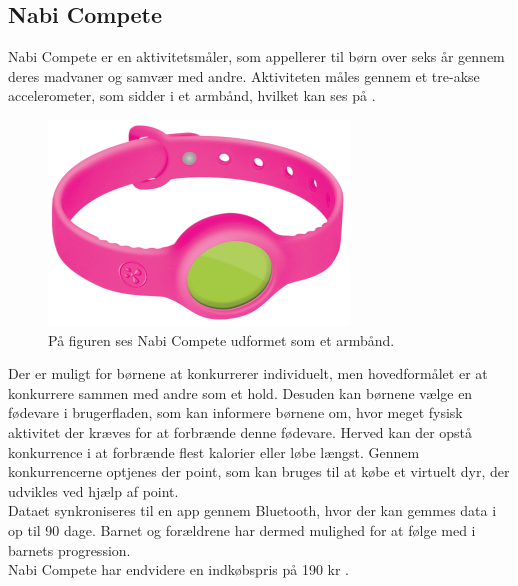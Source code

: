 \subsection{Nabi Compete}
Nabi Compete er en aktivitetsmåler, som appellerer til børn over seks år gennem deres madvaner og samvær med andre. Aktiviteten måles gennem et tre-akse accelerometer, som sidder i et armbånd, hvilket kan ses på .
\begin{figure}[H]
	\centering
	\includegraphics[scale=0.55]{figures/aProblemanalyse/nabi.png}
	\caption{På figuren ses Nabi Compete udformet som et armbånd. \citep{Perez2015}}
	\label{fig:nabi}
\end{figure}\vspace{-.25cm}
Der er muligt for børnene at konkurrerer individuelt, men hovedformålet er at konkurrere sammen med andre som et hold. Desuden kan børnene vælge en fødevare i brugerfladen, som kan informere børnene om, hvor meget fysisk aktivitet der kræves for at forbrænde denne fødevare. Herved kan der opstå konkurrence i at forbrænde flest kalorier eller løbe længst. Gennem konkurrencerne optjenes der point, som kan bruges til at købe et virtuelt dyr, der udvikles ved hjælp af point. \\
Dataet synkroniseres til en app gennem Bluetooth, hvor der kan gemmes data i op til 90 dage. Barnet og forældrene har dermed mulighed for at følge med i barnets progression. \\
Nabi Compete har endvidere en indkøbspris på 190 kr \citep{Fuhu2015,Fuhu_tech2015}.

